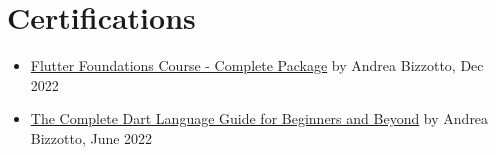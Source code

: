 \documentclass[11pt,a4paper,sans]{moderncv}
\begin{document}
\section{Certifications}
\begin{itemize}
    \item \href{https://drive.google.com/file/d/1_ucRipd-6IVOl7d7c_RrxXeFLhvNtAYg/view?usp=sharing}{Flutter Foundations Course - Complete Package} by Andrea Bizzotto, Dec 2022
    \item \href{https://drive.google.com/file/d/1zp7iSDNFgM1W0UPfpp50O1DM91jSRnw0/view?usp=sharing}{The Complete Dart Language Guide for Beginners and Beyond} by Andrea Bizzotto, June 2022
\end{itemize}
\end{document}
